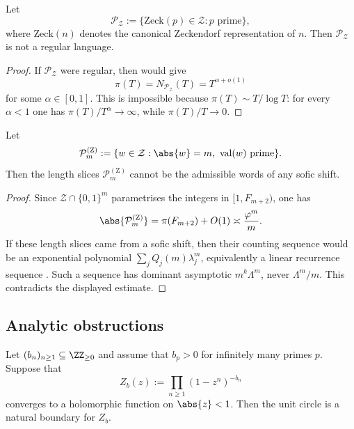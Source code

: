 \begin{corollary}
  \label{cor:zeckendorf-prime-language-not-regular}
  Let
  \[
    \mathcal P_{\mathcal Z}
    :=\{\mathrm{Zeck}(p)\in\mathcal Z:p\text{ prime}\},
  \]
  where $\mathrm{Zeck}(n)$ denotes the canonical Zeckendorf
  representation of $n$. Then $\mathcal P_{\mathcal Z}$ is not a
  regular language.
\end{corollary}

\begin{proof}
  If $\mathcal P_{\mathcal Z}$ were regular, then
   would give
  \[
    \pi(T)=N_{\mathcal P_{\mathcal Z}}(T)=T^{\alpha+o(1)}
  \]
  for some $\alpha\in[0,1]$. This is impossible because
  $\pi(T)\sim T/\log T$: for every $\alpha<1$ one has
  $\pi(T)/T^\alpha\to\infty$, while $\pi(T)/T\to 0$.
\end{proof}

\begin{theorem}
  \label{thm:zeckendorf-primes-not-sofic}
  Let
  \[
    \mathcal P_m^{(\mathrm Z)}
    :=\{w\in\mathcal Z:\abs{w}=m,\ \mathrm{val}(w)\text{ prime}\}.
  \]
  Then the length slices $\mathcal P_m^{(\mathrm Z)}$ cannot be the
  admissible words of any sofic shift.
\end{theorem}

\begin{proof}
  Since $\mathcal Z\cap\{0,1\}^m$ parametrises the integers in
  $[1,F_{m+2})$, one has
  \[
    \abs{\mathcal P_m^{(\mathrm Z)}}
    =\pi(F_{m+2})+O(1)
    \asymp \frac{\varphi^m}{m}.
  \]
  If these length slices came from a sofic shift, then their counting
  sequence would be an exponential polynomial
  $\sum_j Q_j(m)\lambda_j^m$, equivalently a linear recurrence
  sequence \cite{LindMarcus1995,Kitchens1998}. Such a sequence has
  dominant asymptotic $m^k\Lambda^m$, never $\Lambda^m/m$. This
  contradicts the displayed estimate.
\end{proof}

\subsection{Analytic obstructions}

\begin{theorem}
  \label{thm:euler-product-natural-boundary}
  Let $(b_n)_{n\ge 1}\subseteq\ZZ_{\ge 0}$ and assume that
  $b_p>0$ for infinitely many primes $p$. Suppose that
  \[
    Z_b(z):=\prod_{n\ge 1}(1-z^n)^{-b_n}
  \]
  converges to a holomorphic function on $\abs{z}<1$. Then the unit
  circle is a natural boundary for $Z_b$.
\end{theorem}

